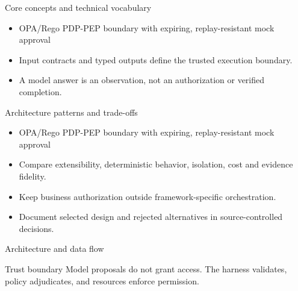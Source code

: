 \documentclass[aspectratio=169,10pt]{beamer}
\begin{document}
\begin{frame}{Core concepts and technical vocabulary}
\small
\begin{itemize}
\item OPA/Rego PDP-PEP boundary with expiring, replay-resistant mock approval
\item Input contracts and typed outputs define the trusted execution boundary.
\item A model answer is an observation, not an authorization or verified completion.
\end{itemize}

\end{frame}

\begin{frame}{Architecture patterns and trade-offs}
\small
\begin{itemize}
\item OPA/Rego PDP-PEP boundary with expiring, replay-resistant mock approval
\item Compare extensibility, deterministic behavior, isolation, cost and evidence fidelity.
\item Keep business authorization outside framework-specific orchestration.
\item Document selected design and rejected alternatives in source-controlled decisions.
\end{itemize}

\end{frame}

\begin{frame}{Architecture and data flow}
\small
\centering
{}
\vspace{0.6cm}
\begin{block}{Trust boundary}
Model proposals do not grant access. The harness validates, policy adjudicates, and resources enforce permission.
\end{block}
\end{frame}
\end{document}
